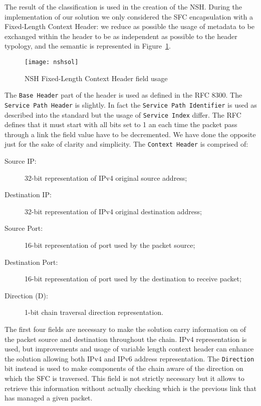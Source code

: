 The result of the classification is used in the creation of the NSH. During the
implementation of our solution we only considered the SFC encapsulation with a
Fixed-Length Context Header: we reduce as possible the usage of metadata to be
exchanged within the header to be as independent as possible to the header
typology, and the semantic is represented in Figure~\ref{chap:impl:img:nsh}.

\begin{figure}
  \centering \texttt{[image: nshsol]}
  \caption{NSH Fixed-Length Context Header field usage}
  \label{chap:impl:img:nsh}
\end{figure}

The \texttt{Base Header} part of the header is used as defined in the RFC 8300.
The \texttt{Service Path Header} is slightly. In fact the 
\texttt{Service Path Identifier} is used as described into the standard but the
usage of \texttt{Service Index} differ. The RFC defines that it must
start with all bits set to 1 an each time the packet pass through a link the
field value have to be decremented. We have done the opposite just for the sake
of clarity and simplicity. The \texttt{Context Header} is comprised of:
\begin{description}
  \item[Source IP:] 32-bit representation of IPv4 original source address;
  \item[Destination IP:] 32-bit representation of IPv4 original destination
  address;
  \item[Source Port:] 16-bit representation of port used by the packet source;
  \item[Destination Port:] 16-bit representation of port used by the destination
  to receive packet;
  \item[Direction (D):] 1-bit chain traversal direction representation.
\end{description}
The first four fields are necessary to make the solution carry information on of
the
packet source and destination throughout the chain. IPv4
representation is used, but improvements and usage of variable length context
header can enhance the solution allowing both IPv4 and IPv6 address
representation. The \texttt{Direction} bit instead is used to make components of
the chain aware of the direction on which the SFC is traversed. This field is
not strictly necessary but it allows to retrieve this information without
actually checking which is the previous link that has managed a given packet. 

